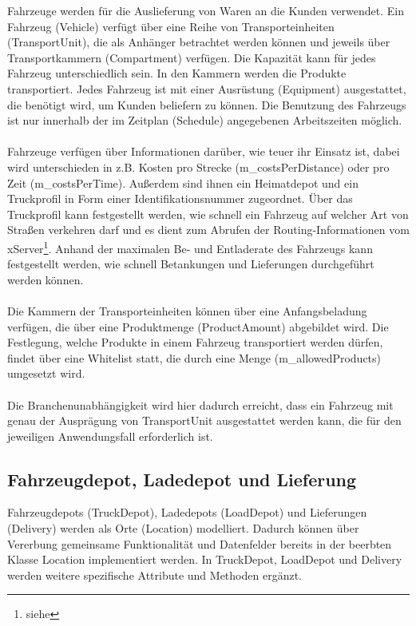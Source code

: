 \noindent
Fahrzeuge werden für die Auslieferung von Waren an die Kunden verwendet. Ein Fahrzeug (\textsf{Vehicle}) verfügt über eine Reihe von Transporteinheiten (\textsf{TransportUnit}), die als Anhänger betrachtet werden können und jeweils über Transportkammern (\textsf{Com\-part\-ment}) verfügen. Die Kapazität kann für jedes Fahrzeug unterschiedlich sein. In den Kammern werden die Produkte transportiert. Jedes Fahrzeug ist mit einer Ausrüstung (\textsf{Equipment}) ausgestattet, die benötigt wird, um Kunden beliefern zu können. Die Benutzung des Fahrzeugs ist nur innerhalb der im Zeitplan (\textsf{Schedule}) angegebenen Arbeitszeiten möglich. \\
\\
Fahrzeuge verfügen über Informationen darüber, wie teuer ihr Einsatz ist, dabei wird unterschieden in z.B. Kosten pro Strecke (\textsf{m\_costsPerDistance}) oder pro Zeit (\textsf{m\_costs\-PerTime}). Außerdem sind ihnen ein Heimatdepot und ein Truckprofil in Form einer Identifikationsnummer zugeordnet. Über das Truckprofil kann festgestellt werden, wie schnell ein Fahrzeug auf welcher Art von Straßen verkehren darf und es dient zum Abrufen der Routing-Informationen vom xServer\footnote{siehe }. Anhand der maximalen Be- und Entladerate des Fahrzeugs kann festgestellt werden, wie schnell Betankungen und Lieferungen durchgeführt werden können. \\
\\
Die Kammern der Transporteinheiten können über eine Anfangsbeladung verfügen, die über eine Produktmenge (\textsf{ProductAmount}) abgebildet wird. Die Festlegung, welche Produkte in einem Fahrzeug transportiert werden dürfen, findet über eine Whitelist statt, die durch eine Menge (\textsf{m\_allowedProducts}) umgesetzt wird. \\
\\
Die Branchenunabhängigkeit wird hier dadurch erreicht, dass ein Fahrzeug mit genau der Ausprägung von \textsf{TransportUnit} ausgestattet werden kann, die für den jeweiligen Anwendungsfall erforderlich ist.


\subsection{Fahrzeugdepot, Ladedepot und Lieferung}
Fahrzeugdepots (\textsf{TruckDepot}), Ladedepots (\textsf{LoadDepot}) und Lieferungen (\textsf{Delivery}) werden als Orte (\textsf{Location}) modelliert. Dadurch können über Vererbung gemeinsame Funktionalität und Datenfelder bereits in der beerbten Klasse \textsf{Location} implementiert werden. In \textsf{TruckDepot}, \textsf{LoadDepot} und \textsf{Delivery} werden weitere spezifische Attribute und Methoden ergänzt.

